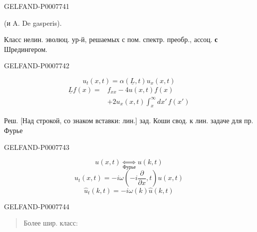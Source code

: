 \begin{GelfandAdjacentEvidence}{GELFAND-P000774}{1}

 (и A. De gasperis).

Класс нелин. эволюц. ур-й, решаемых с пом. спектр. преобр., ассоц.
\textbf{с} Шредингером.
\end{GelfandAdjacentEvidence}
\begin{GelfandAdjacentEvidence}{GELFAND-P000774}{2}


\begin{equation}
u_t(x,t)=\alpha(\underline L,t)u_x(x,t)\tag{1}
\end{equation}
\begin{equation}
\begin{split}
\underline L f(x)={}&f_{xx}-4u(x,t)f(x)\\
&+2u_x(x,t)\int_x^\infty dx'\,f(x')
\end{split}\tag{2}
\end{equation}

Реш. [Над строкой, со знаком вставки: лин.] зад. Коши свод. к лин. задаче для пр. Фурье
\end{GelfandAdjacentEvidence}
\begin{GelfandAdjacentEvidence}{GELFAND-P000774}{3}


\[
u(x,t)\underset{\text{Фурье}}{\Longleftrightarrow}u(k,t)
\]
\[
u_t(x,t)=-i\omega\left(-i\frac{\partial}{\partial x},t\right)u(x,t)
\]
\[
\hat u_t(k,t)=-i\omega(k)\hat u(k,t)
\]
\end{GelfandAdjacentEvidence}
\begin{GelfandAdjacentEvidence}{GELFAND-P000774}{4}


\begin{quote}
Более шир. класс:
\end{quote}
\end{GelfandAdjacentEvidence}
